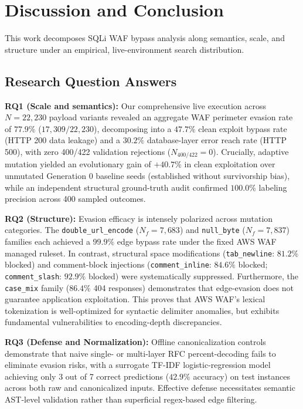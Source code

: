 \section{Discussion and Conclusion}
\label{sec:discussion}
This work decomposes SQLi WAF bypass analysis along semantics, scale, and structure under an empirical, live-environment search distribution.

\subsection{Research Question Answers}
\textbf{RQ1 (Scale and semantics):} Our comprehensive live execution across $N=22{,}230$ payload variants revealed an aggregate WAF perimeter evasion rate of $77.9\%$ ($17{,}309/22{,}230$), decomposing into a $47.7\%$ clean exploit bypass rate (HTTP 200 data leakage) and a $30.2\%$ database-layer error reach rate (HTTP 500), with zero 400/422 validation rejections ($N_{400/422}=0$). Crucially, adaptive mutation yielded an evolutionary gain of $+40.7\%$ in clean exploitation over unmutated Generation 0 baseline seeds (established without survivorship bias), while an independent structural ground-truth audit confirmed $100.0\%$ labeling precision across 400 sampled outcomes.

\textbf{RQ2 (Structure):} Evasion efficacy is intensely polarized across mutation categories. The \texttt{double\_url\_encode} ($N_f=7{,}683$) and \texttt{null\_byte} ($N_f=7{,}837$) families each achieved a $99.9\%$ edge bypass rate under the fixed AWS WAF managed ruleset. In contrast, structural space modifications (\texttt{tab\_newline}: $81.2\%$ blocked) and comment-block injections (\texttt{comment\_inline}: $84.6\%$ blocked; \texttt{comment\_slash}: $92.9\%$ blocked) were systematically suppressed. Furthermore, the \texttt{case\_mix} family ($86.4\%$ 404 responses) demonstrates that edge-evasion does not guarantee application exploitation. This proves that AWS WAF's lexical tokenization is well-optimized for syntactic delimiter anomalies, but exhibits fundamental vulnerabilities to encoding-depth discrepancies.

\textbf{RQ3 (Defense and Normalization):} Offline canonicalization controls demonstrate that naive single- or multi-layer RFC percent-decoding fails to eliminate evasion risks, with a surrogate TF-IDF logistic-regression model achieving only 3 out of 7 correct predictions ($42.9\%$ accuracy) on test instances across both raw and canonicalized inputs. Effective defense necessitates semantic AST-level validation rather than superficial regex-based edge filtering.


